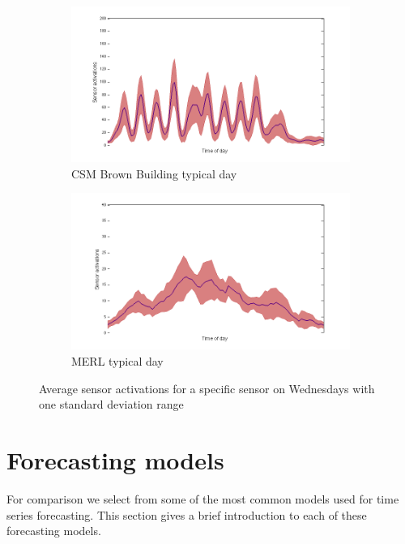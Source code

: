 \documentclass{acm_proc_article-sp}
\begin{document}
\begin{figure}[t!]
\centering
\begin{subfigure}{.45\textwidth}
  \centering
  \includegraphics[width=1.0\linewidth]{brown_day.png}
  \caption{CSM Brown Building typical day}
  \label{fig:csmday}
\end{subfigure}
\begin{subfigure}{.45\textwidth}
  \centering
  \includegraphics[width=1.0\linewidth]{merl_day.png}
  \caption{MERL typical day}
  \label{fig:merlday}
\end{subfigure}
\caption{Average sensor activations for a specific sensor on Wednesdays with one standard deviation range}
\label{fig:dayplot}
\end{figure}


\section{Forecasting models}
For comparison we select from some of the most common models used for time series forecasting.  This section gives a brief introduction to each of these forecasting models. 
\end{document}
